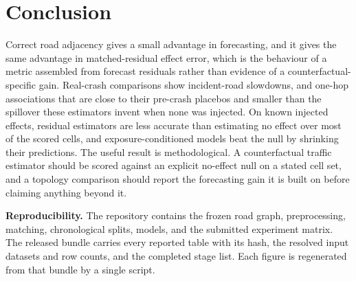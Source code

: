 \documentclass[sigconf,nonacm]{acmart}
\begin{document}
\section{Conclusion}
Correct road adjacency gives a small advantage in forecasting, and it gives the same advantage in matched-residual effect error, which is the behaviour of a metric assembled from forecast residuals rather than evidence of a counterfactual-specific gain. Real-crash comparisons show incident-road slowdowns, and one-hop associations that are close to their pre-crash placebos and smaller than the spillover these estimators invent when none was injected. On known injected effects, residual estimators are less accurate than estimating no effect over most of the scored cells, and exposure-conditioned models beat the null by shrinking their predictions. The useful result is methodological. A counterfactual traffic estimator should be scored against an explicit no-effect null on a stated cell set, and a topology comparison should report the forecasting gain it is built on before claiming anything beyond it.

\noindent\textbf{Reproducibility.} The repository contains the frozen road graph, preprocessing, matching, chronological splits, models, and the submitted experiment matrix. The released bundle carries every reported table with its hash, the resolved input datasets and row counts, and the completed stage list. Each figure is regenerated from that bundle by a single script.



\end{document}
